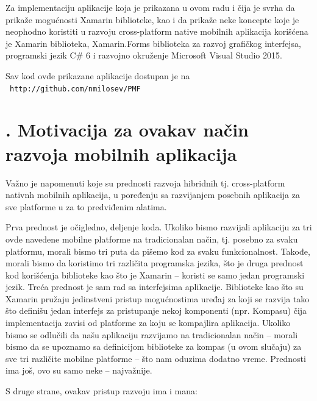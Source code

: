 \documentclass[a4paper]{article}
\begin{document}
Za implementaciju aplikacije koja je prikazana u ovom radu i čija je
svrha da prikaže mogućnosti Xamarin biblioteke, kao i da prikaže neke
koncepte koje je neophodno koristiti u razvoju cross-platform native
mobilnih aplikacija korišćena je Xamarin biblioteka, Xamarin.Forms
biblioteka za razvoj grafičkog interfejsa, programski jezik C\# 6 i
razvojno okruženje Microsoft Visual Studio 2015.

Sav kod ovde prikazane aplikacije dostupan je na
\ \texttt{\textcolor[rgb]{0.0,0.4,0.8}{http://github.com/nmilosev/PMF}}\texttt{\textcolor[rgb]{0.4,0.6,0.6}{
}}

\clearpage\section[4. Motivacija za ovakav način razvoja mobilnih
aplikacija]{. Motivacija za ovakav način razvoja mobilnih
aplikacija}
\hypertarget{RefHeadingToc4171813786090}{}Važno je napomenuti koje su
prednosti razvoja hibridnih tj. cross-platform nativnh mobilnih
aplikacija, u poređenju sa razvijanjem posebnih aplikacija za sve
platforme u za to predviđenim alatima.

Prva prednost je očigledno, deljenje koda. Ukoliko bismo razvijali
aplikaciju za tri ovde navedene mobilne platforme na tradicionalan
način, tj. posebno za svaku platformu, morali bismo tri puta da pišemo
kod za svaku funkcionalnost. Takođe, morali bismo da koristimo tri
različita programska jezika, što je druga prednost kod korišćenja
biblioteke kao što je Xamarin – koristi se samo jedan programski jezik.
Treća prednost je sam rad sa interfejsima aplikacije. Biblioteke kao
što su Xamarin pružaju jedinstveni pristup mogućnostima uređaj za koji
se razvija tako što definišu jedan interfejs za pristupanje nekoj
komponenti (npr. Kompasu) čija implementacija zavisi od platforme za
koju se kompajlira aplikacija. Ukoliko bismo se odlučili da našu
aplikaciju razvijamo na tradicionalan način – morali bismo da se
upoznamo sa definicijom biblioteke za kompas (u ovom slučaju) za sve
tri različite mobilne platforme – što nam oduzima dodatno vreme.
Prednosti ima još, ovo su samo neke – najvažnije.

S druge strane, ovakav pristup razvoju ima i mana:
\end{document}

